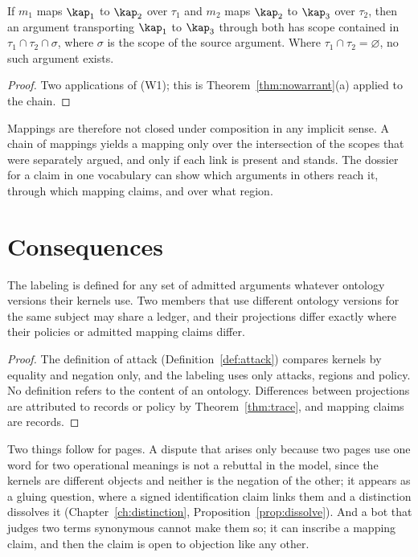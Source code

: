 \begin{corollary}\label{cor:chainmap}
If $m_1$ maps $\kap_1$ to $\kap_2$ over $\tau_1$ and $m_2$ maps $\kap_2$ to $\kap_3$ over $\tau_2$, then an argument transporting $\kap_1$ to $\kap_3$ through both has scope contained in $\tau_1\cap\tau_2\cap\sigma$, where $\sigma$ is the scope of the source argument. Where $\tau_1\cap\tau_2=\varnothing$, no such argument exists.
\end{corollary}

\begin{proof}
Two applications of (W1); this is Theorem~\ref{thm:nowarrant}(a) applied to the chain.
\end{proof}

Mappings are therefore not closed under composition in any implicit sense. A chain of mappings yields a mapping only over the intersection of the scopes that were separately argued, and only if each link is present and stands. The dossier for a claim in one vocabulary can show which arguments in others reach it, through which mapping claims, and over what region.

\section{Consequences}\label{sec:ontconsequences}

\begin{proposition}\label{prop:noontology}
The labeling is defined for any set of admitted arguments whatever ontology versions their kernels use. Two members that use different ontology versions for the same subject may share a ledger, and their projections differ exactly where their policies or admitted mapping claims differ.
\end{proposition}

\begin{proof}
The definition of attack (Definition~\ref{def:attack}) compares kernels by equality and negation only, and the labeling uses only attacks, regions and policy. No definition refers to the content of an ontology. Differences between projections are attributed to records or policy by Theorem~\ref{thm:trace}, and mapping claims are records.
\end{proof}

Two things follow for pages. A dispute that arises only because two pages use one word for two operational meanings is not a rebuttal in the model, since the kernels are different objects and neither is the negation of the other; it appears as a gluing question, where a signed identification claim links them and a distinction dissolves it (Chapter~\ref{ch:distinction}, Proposition~\ref{prop:dissolve}). And a bot that judges two terms synonymous cannot make them so; it can inscribe a mapping claim, and then the claim is open to objection like any other.
